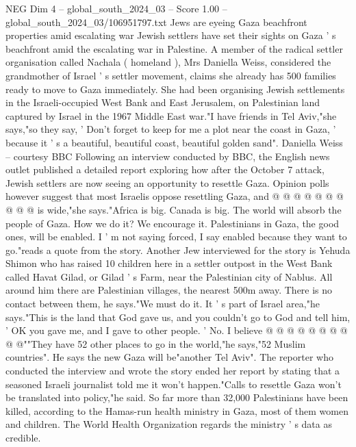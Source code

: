 \begin{textsample}{NEG Dim 4 – global\_south\_2024\_03 – Score 1.00 – global\_south\_2024\_03/106951797.txt}  \label{ex:f4_neg_359}
Jews are eyeing Gaza beachfront properties amid escalating war Jewish settlers have set their sights on Gaza ' s beachfront amid the escalating war in Palestine.
A member of the radical settler organisation called Nachala ( homeland ), Mrs Daniella Weiss, considered the grandmother of Israel ' s settler movement, claims she already has 500 families ready to move to Gaza immediately.
She had been organising Jewish settlements in the Israeli-occupied West Bank and East Jerusalem, on Palestinian land captured by Israel in the 1967 Middle East war."I have friends in Tel Aviv,"she says,"so they say, ' Don't forget to keep for me a plot near the coast in Gaza, ' because it ' s a beautiful, beautiful coast, beautiful golden sand".
Daniella Weiss -- courtesy BBC Following an interview conducted by BBC, the English news outlet published a detailed report exploring how after the October 7 attack, Jewish settlers are now seeing an opportunity to resettle Gaza.
Opinion polls however suggest that most Israelis oppose resettling Gaza, and @ @ @ @ @ @ @ @ @ @ is wide,"she says."Africa is big.
Canada is big.
The world will absorb the people of Gaza.
How we do it?
We encourage it.
Palestinians in Gaza, the good ones, will be enabled.
I ' m not saying forced, I say enabled because they want to go."reads a quote from the story.
Another Jew interviewed for the story is Yehuda Shimon who has raised 10 children here in a settler outpost in the West Bank called Havat Gilad, or Gilad ' s Farm, near the Palestinian city of Nablus.
All around him there are Palestinian villages, the nearest 500m away.
There is no contact between them, he says."We must do it.
It ' s part of Israel area,"he says."This is the land that God gave us, and you couldn't go to God and tell him, ' OK you gave me, and I gave to other people. ' No.
I believe @ @ @ @ @ @ @ @ @ @""They have 52 other places to go in the world,"he says,"52 Muslim countries".
He says the new Gaza will be"another Tel Aviv".
The reporter who conducted the interview and wrote the story ended her report by stating that a seasoned Israeli journalist told me it won't happen."Calls to resettle Gaza won't be translated into policy,"he said.
So far more than 32,000 Palestinians have been killed, according to the Hamas-run health ministry in Gaza, most of them women and children.
The World Health Organization regards the ministry ' s data as credible.

\end{textsample}
